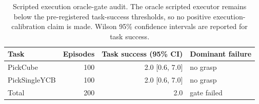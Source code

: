 \begin{table}[t]
\centering
\caption{Scripted execution oracle-gate audit. The oracle scripted executor remains below the pre-registered task-success thresholds, so no positive execution-calibration claim is made. Wilson 95\% confidence intervals are reported for task success.}
\label{tab:closed-loop-v2-gate}
\scriptsize
\begin{tabular}{lrrl}
\toprule
Task & Episodes & Task success (95\% CI) & Dominant failure \\
\midrule
PickCube & 100 & 2.0 [0.6, 7.0] & no grasp \\
PickSingleYCB & 100 & 2.0 [0.6, 7.0] & no grasp \\
\midrule
Total & 200 & 2.0 & gate failed \\
\bottomrule
\end{tabular}
\end{table}
